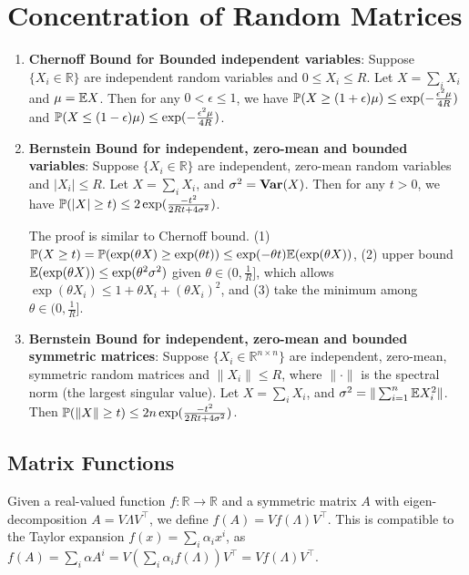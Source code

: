 \section{Concentration of Random Matrices}

\begin{enumerate}
    \item \textbf{Chernoff Bound for Bounded independent variables}: Suppose $\{X_i \in \mathbb{R}\}$ are independent random variables and $0\le X_i \le R$. Let $X = \sum_i X_i$ and $\mu = \mathbb{E} X$. Then for any $0<\epsilon \le 1$, we have $\mathbb{P}(X \ge (1+\epsilon)\mu) \le \exp(-\frac{\epsilon^2 \mu}{4R})$ and $\mathbb{P}(X \le (1-\epsilon)\mu) \le \exp(-\frac{\epsilon^2 \mu}{4R})$.
    \item \textbf{Bernstein Bound for independent, zero-mean and bounded variables}: Suppose $\{X_i \in \mathbb{R}\}$ are independent, zero-mean random variables and $|X_i| \le R$. Let $X = \sum_i X_i$, and $\sigma^2 = \operatorname{\textbf{Var}}(X)$. Then for any $t > 0$, we have $\mathbb{P}(|X| \ge t) \le 2\exp(\frac{-t^2}{2Rt+4\sigma^2})$.

    The proof is similar to Chernoff bound. (1) $\mathbb{P}(X\ge t) = \mathbb{P}(\exp(\theta X) \ge \exp(\theta t)) \le \exp(-\theta t)\mathbb{E} (\exp(\theta X))$, (2) upper bound $\mathbb{E} (\exp(\theta X)) \le \exp(\theta^2 \sigma^2)$ given $\theta \in (0, \frac{1}{R}]$, which allows $\exp(\theta X_i) \le 1+\theta X_i +(\theta X_i)^2$, and (3) take the minimum among $\theta \in (0,\frac{1}{R}]$.

    \item \textbf{Bernstein Bound for independent, zero-mean and bounded symmetric matrices}: Suppose $\{X_i \in \mathbb{R}^{n\times n}\}$ are independent, zero-mean, symmetric random matrices and $\|X_i\| \le R$, where $\|\cdot\|$ is the spectral norm (the largest singular value). Let $X = \sum_i X_i$, and $\sigma^2 = \|\sum_{i=1}^n \mathbb{E} X_i^2\|$. Then $\mathbb{P}(\|X\|\ge t) \le 2n \exp(\frac{-t^2}{2Rt+4\sigma^2})$.
\end{enumerate}

\subsection{Matrix Functions}

Given a real-valued function $f: \mathbb{R}\rightarrow \mathbb{R}$ and a symmetric matrix $A$ with eigen-decomposition $A=V\Lambda V^\top$, we define $f(A) = V f(\Lambda) V^\top$. This is compatible to the Taylor expansion $f(x) = \sum_i \alpha_i x^i$, as $f(A) = \sum_i \alpha A^i = V (\sum_i \alpha_i f(\Lambda)) V^\top = V f(\Lambda) V^\top$.

